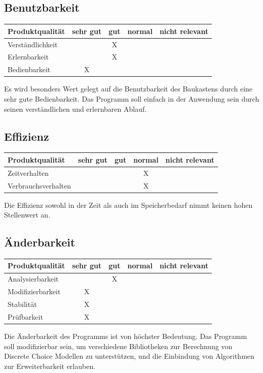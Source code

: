 \documentclass{article}
\begin{document}
\subsection{Benutzbarkeit}
\begin{table}[H]
\centering
\begin{tabular}{lcccc}
\hline
\textbf{Produktqualität} & sehr gut & gut & normal & nicht relevant \\ \hline
Verständlichkeit         &          & X   &        &                \\
Erlernbarkeit            &          & X   &        &                \\
Bedienbarkeit            & X        &     &        &                \\
\end{tabular}
\end{table}
Es wird besonders Wert gelegt auf die Benutzbarkeit des Baukastens durch eine sehr gute Bedienbarkeit. Das Programm soll einfach in der Anwendung sein durch seinen verständlichen und erlernbaren Ablauf.

\subsection{Effizienz}
\begin{table}[H]
\centering
\begin{tabular}{lcccc}
\hline
\textbf{Produktqualität} & sehr gut & gut & normal & nicht relevant \\ \hline
Zeitverhalten            &          &     & X      &                \\
Verbrauchsverhalten      &          &     & X      &               
\end{tabular}
\end{table}
Die Effizienz sowohl in der Zeit als auch im Speicherbedarf nimmt keinen hohen Stellenwert an. 

\subsection{Änderbarkeit}
\begin{table}[H]
\centering
\begin{tabular}{lcccc}
\hline
\textbf{Produktqualität} & sehr gut & gut & normal & nicht relevant \\ \hline
Analysierbarkeit         &          & X   &        &                \\
Modifizierbarkeit        & X        &     &        &                \\
Stabilität               & X        &     &        &                \\
Prüfbarkeit              & X        &     &        &                \\
\end{tabular}
\end{table}
Die Änderbarkeit des Programms ist von höchster Bedeutung. Das Programm soll modifizierbar sein, um verschiedene Bibliotheken zur Berechnung von Discrete Choice Modellen zu unterstützen, und die Einbindung von Algorithmen zur Erweiterbarkeit erlauben.

\newpage
\printglossaries
\end{document}
